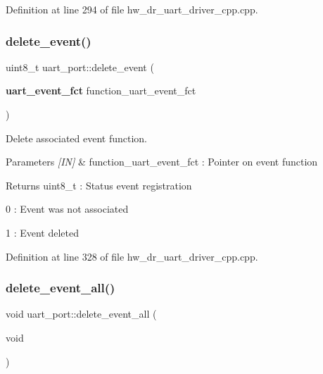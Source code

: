 Definition at line 294 of file hw\+\_\+dr\+\_\+uart\+\_\+driver\+\_\+cpp.\+cpp.

\mbox{\label{group___u_a_r_t_gae98017cfd3b85a7933d2695f7ba90911}} 
\subsubsection{delete\_event()}
{\footnotesize\ttfamily uint8\+\_\+t uart\+\_\+port\+::delete\+\_\+event (\begin{DoxyParamCaption}\item[{\textbf{ uart\+\_\+event\+\_\+fct}}]{function\+\_\+uart\+\_\+event\+\_\+fct }\end{DoxyParamCaption})}



Delete associated event function. 


\begin{DoxyParams}{Parameters}
{\em \mbox{[}\+I\+N\mbox{]}} & function\+\_\+uart\+\_\+event\+\_\+fct \+: Pointer on event function \\
\hline
\end{DoxyParams}
\begin{DoxyReturn}{Returns}
uint8\+\_\+t \+: Status event registration \begin{DoxyItemize}
\item 0 \+: Event was not associated \item 1 \+: Event deleted \end{DoxyItemize}

\end{DoxyReturn}


Definition at line 328 of file hw\+\_\+dr\+\_\+uart\+\_\+driver\+\_\+cpp.\+cpp.

\mbox{\label{group___u_a_r_t_gafa8639fc595c43a56fe92ff89c256414}} 
\subsubsection{delete\_event\_all()}
{\footnotesize\ttfamily void uart\+\_\+port\+::delete\+\_\+event\+\_\+all (\begin{DoxyParamCaption}\item[{void}]{ }\end{DoxyParamCaption})}



